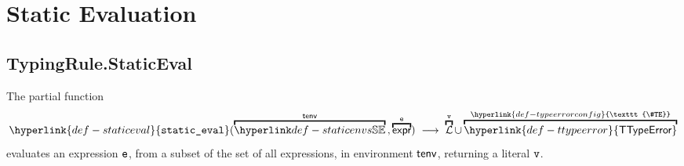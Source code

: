 \documentclass{book}
\newcommand\literals[0]{\mathcal{L}}
\newcommand\TTypeError[0]{\hyperlink{def-ttypeerror}{\textsf{TTypeError}}}
\newcommand\TypeErrorConfig[0]{\hyperlink{def-typeerrorconfig}{\texttt{\#TE}}}
\newcommand\staticeval[0]{\hyperlink{def-staticeval}{\texttt{static\_eval}}}
\begin{document}
\chapter{Static Evaluation}
\label{chap:staticevaluation}

\hypertarget{def-staticeval}{}
\section{TypingRule.StaticEval}
The partial function
\[
  \staticeval(\overname{\staticenvs}{\tenv} \aslsep \overname{\expr}{\ve}) \;\aslto\;
  \overname{\literals}{\vv} \cup \overname{\TTypeError}{\TypeErrorConfig}
\]
evaluates an expression $\texttt{e}$, from a subset of the set of all expressions, in environment $\textsf{tenv}$, returning a literal $\texttt{v}$.
\end{document}
